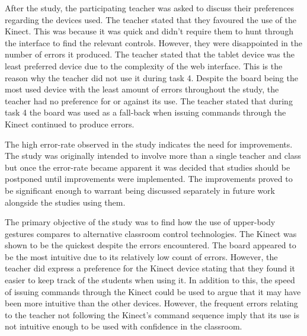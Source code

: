\documentclass[link]{IWCOMP}
\begin{document}
After the study, the participating teacher was asked to discuss their preferences regarding the devices used.
The teacher stated that they favoured the use of the Kinect.
This was because it was quick and didn't require them to hunt through the interface to find the relevant controls.
However, they were disappointed in the number of errors it produced.
The teacher stated that the tablet device was the least preferred device due to the complexity of the web interface.
This is the reason why the teacher did not use it during task 4.
Despite the board being the most used device with the least amount of errors throughout the study, the teacher had no preference for or against its use.
The teacher stated that during task 4 the board was used as a fall-back when issuing commands through the Kinect continued to produce errors.

The high error-rate observed in the study indicates the need for improvements.
The study was originally intended to involve more than a single teacher and class but once the error-rate became apparent it was decided that studies should be postponed until improvements were implemented.
The improvements proved to be significant enough to warrant being discussed separately in future work alongside the studies using them.






The primary objective of the study was to find how the use of upper-body gestures compares to alternative classroom control technologies.
The Kinect was shown to be the quickest despite the errors encountered.
The board appeared to be the most intuitive due to its relatively low count of errors.
However, the teacher did express a preference for the Kinect device stating that they found it easier to keep track of the students when using it.
In addition to this, the speed of issuing commands through the Kinect could be used to argue that it may have been more intuitive than the other devices.
However, the frequent errors relating to the teacher not following the Kinect's command sequence imply that its use is not intuitive enough to be used with confidence in the classroom.
\end{document}
